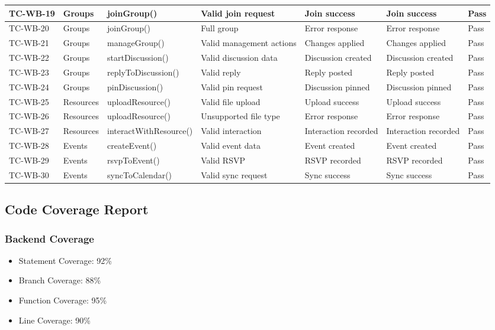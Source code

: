 {\begin{longtable}{|p{1.5cm}|p{2.2cm}|p{2.5cm}|p{2.5cm}|p{2.5cm}|p{2.5cm}|p{1.5cm}|}
\hline
TC-WB-19 & Groups & joinGroup() & Valid join request & Join success & Join success & Pass \\
\hline
TC-WB-20 & Groups & joinGroup() & Full group & Error response & Error response & Pass \\
\hline
TC-WB-21 & Groups & manageGroup() & Valid management actions & Changes applied & Changes applied & Pass \\
\hline
TC-WB-22 & Groups & startDiscussion() & Valid discussion data & Discussion created & Discussion created & Pass \\
\hline
TC-WB-23 & Groups & replyToDiscussion() & Valid reply & Reply posted & Reply posted & Pass \\
\hline
TC-WB-24 & Groups & pinDiscussion() & Valid pin request & Discussion pinned & Discussion pinned & Pass \\
\hline
TC-WB-25 & Resources & uploadResource() & Valid file upload & Upload success & Upload success & Pass \\
\hline
TC-WB-26 & Resources & uploadResource() & Unsupported file type & Error response & Error response & Pass \\
\hline
TC-WB-27 & Resources & interactWithResource() & Valid interaction & Interaction recorded & Interaction recorded & Pass \\
\hline
TC-WB-28 & Events & createEvent() & Valid event data & Event created & Event created & Pass \\
\hline
TC-WB-29 & Events & rsvpToEvent() & Valid RSVP & RSVP recorded & RSVP recorded & Pass \\
\hline
TC-WB-30 & Events & syncToCalendar() & Valid sync request & Sync success & Sync success & Pass \\
\hline
\end{longtable}
}

\subsection{Code Coverage Report}

\subsubsection{Backend Coverage}
\begin{itemize}
    \item Statement Coverage: 92\%
    \item Branch Coverage: 88\%
    \item Function Coverage: 95\%
    \item Line Coverage: 90\%
\end{itemize}


